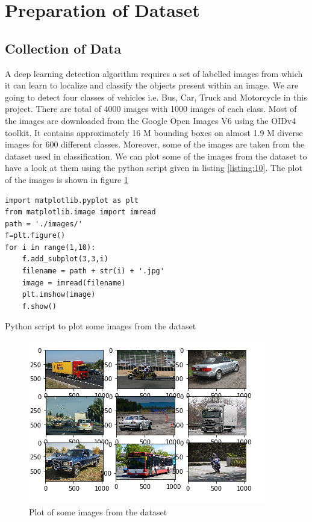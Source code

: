   \section{Preparation of Dataset}
  \subsection{Collection of Data}
  A deep learning  detection algorithm requires a set of labelled images from which it can learn to localize and classify the objects present within an image. We are going to detect four classes of vehicles i.e. Bus, Car, Truck and Motorcycle in this project. There are total of 4000 images with 1000 images of each class. Most of the images are downloaded from the Google Open Images V6 using the OIDv4 toolkit. It contains approximately 16 M bounding boxes on almost 1.9 M diverse images for 600 different classes. Moreover, some of the images are taken from the dataset used in classification. We can plot some of the images from the dataset to have a look at them using the python script given in listing \ref{listing:10}. The plot of the images is shown in figure \ref{fig:5.6}
\linespread{1.0}
\begin{longlisting}
\begin{verbatim}
import matplotlib.pyplot as plt
from matplotlib.image import imread
path = './images/'
f=plt.figure()
for i in range(1,10):
    f.add_subplot(3,3,i)
    filename = path + str(i) + '.jpg'
    image = imread(filename)
    plt.imshow(image)   
    f.show()
\end{verbatim}
\caption{Python script to plot some images from the dataset}
\label{listing:10}
\end{longlisting}
\begin{figure}[H]
\centering
\captionsetup{justification = centering}
\includegraphics[width = 10 cm, height = 9.5 cm]{CHAPTERS/Chapter-5/images/5.6.PNG}
 \caption{Plot of some images from the dataset } 
 \label{fig:5.6}
 \end{figure}
